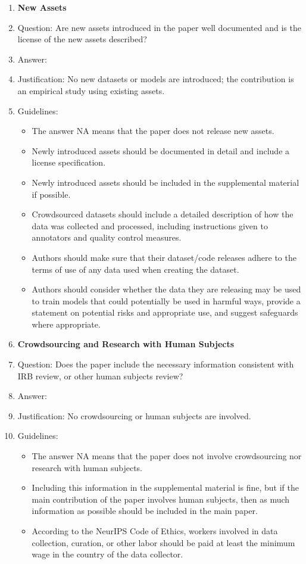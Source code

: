 \documentclass{article}
\begin{document}
\begin{enumerate}
\item {\bf New Assets}
\item[] Question: Are new assets introduced in the paper well documented and is the license of the new assets described?
\item[] Answer: \answerNA{}
\item[] Justification: No new datasets or models are introduced; the contribution is an empirical study using existing assets.
\item[] Guidelines:
\begin{itemize}
    \item The answer NA means that the paper does not release new assets.
    \item Newly introduced assets should be documented in detail and include a license specification.
    \item Newly introduced assets should be included in the supplemental material if possible.
    \item Crowdsourced datasets should include a detailed description of how the data was collected and processed, including instructions given to annotators and quality control measures.
    \item Authors should make sure that their dataset/code releases adhere to the terms of use of any data used when creating the dataset.
    \item Authors should consider whether the data they are releasing may be used to train models that could potentially be used in harmful ways, provide a statement on potential risks and appropriate use, and suggest safeguards where appropriate.
\end{itemize}

\item {\bf Crowdsourcing and Research with Human Subjects}
\item[] Question: Does the paper include the necessary information consistent with IRB review, or other human subjects review?
\item[] Answer: \answerNA{}
\item[] Justification: No crowdsourcing or human subjects are involved.
\item[] Guidelines:
\begin{itemize}
    \item The answer NA means that the paper does not involve crowdsourcing nor research with human subjects.
    \item Including this information in the supplemental material is fine, but if the main contribution of the paper involves human subjects, then as much information as possible should be included in the main paper.
    \item According to the NeurIPS Code of Ethics, workers involved in data collection, curation, or other labor should be paid at least the minimum wage in the country of the data collector.
\end{itemize}


\end{enumerate}
\end{document}
